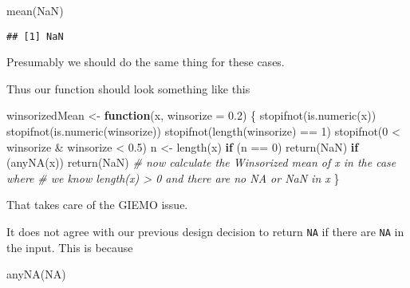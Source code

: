 \documentclass[
]{article}
\newenvironment{Shaded}{\begin{snugshade}}{\end{snugshade}}
\newcommand{\AttributeTok}[1]{\textcolor[rgb]{0.77,0.63,0.00}{#1}}
\newcommand{\CommentTok}[1]{\textcolor[rgb]{0.56,0.35,0.01}{\textit{#1}}}
\newcommand{\ConstantTok}[1]{\textcolor[rgb]{0.00,0.00,0.00}{#1}}
\newcommand{\ControlFlowTok}[1]{\textcolor[rgb]{0.13,0.29,0.53}{\textbf{#1}}}
\newcommand{\DecValTok}[1]{\textcolor[rgb]{0.00,0.00,0.81}{#1}}
\newcommand{\FloatTok}[1]{\textcolor[rgb]{0.00,0.00,0.81}{#1}}
\newcommand{\FunctionTok}[1]{\textcolor[rgb]{0.00,0.00,0.00}{#1}}
\newcommand{\NormalTok}[1]{#1}
\newcommand{\OtherTok}[1]{\textcolor[rgb]{0.56,0.35,0.01}{#1}}
\newcommand{\SpecialCharTok}[1]{\textcolor[rgb]{0.00,0.00,0.00}{#1}}
\begin{document}
\begin{Shaded}
\begin{Highlighting}[]
\FunctionTok{mean}\NormalTok{(}\ConstantTok{NaN}\NormalTok{)}
\end{Highlighting}
\end{Shaded}

\begin{verbatim}
## [1] NaN
\end{verbatim}

Presumably we should do the same thing for these cases.

Thus our function should look something like this

\begin{Shaded}
\begin{Highlighting}[]
\NormalTok{winsorizedMean }\OtherTok{\textless{}{-}} \ControlFlowTok{function}\NormalTok{(x, }\AttributeTok{winsorize =} \FloatTok{0.2}\NormalTok{) \{}
    \FunctionTok{stopifnot}\NormalTok{(}\FunctionTok{is.numeric}\NormalTok{(x))}
    \FunctionTok{stopifnot}\NormalTok{(}\FunctionTok{is.numeric}\NormalTok{(winsorize))}
    \FunctionTok{stopifnot}\NormalTok{(}\FunctionTok{length}\NormalTok{(winsorize) }\SpecialCharTok{==} \DecValTok{1}\NormalTok{)}
    \FunctionTok{stopifnot}\NormalTok{(}\DecValTok{0} \SpecialCharTok{\textless{}}\NormalTok{ winsorize }\SpecialCharTok{\&}\NormalTok{ winsorize }\SpecialCharTok{\textless{}} \FloatTok{0.5}\NormalTok{)}
\NormalTok{    n }\OtherTok{\textless{}{-}} \FunctionTok{length}\NormalTok{(x)}
    \ControlFlowTok{if}\NormalTok{ (n }\SpecialCharTok{==} \DecValTok{0}\NormalTok{) }\FunctionTok{return}\NormalTok{(}\ConstantTok{NaN}\NormalTok{)}
    \ControlFlowTok{if}\NormalTok{ (}\FunctionTok{anyNA}\NormalTok{(x)) }\FunctionTok{return}\NormalTok{(}\ConstantTok{NaN}\NormalTok{)}
    \CommentTok{\# now calculate the Winsorized mean of x in the case where}
    \CommentTok{\# we know length(x) \textgreater{} 0 and there are no NA or NaN in x}
\NormalTok{\}}
\end{Highlighting}
\end{Shaded}

That takes care of the GIEMO issue.

It does not agree with our previous design decision to return
\texttt{NA} if there are \texttt{NA} in the input. This is because

\begin{Shaded}
\begin{Highlighting}[]
\FunctionTok{anyNA}\NormalTok{(}\ConstantTok{NA}\NormalTok{)}
\end{Highlighting}
\end{Shaded}
\end{document}
